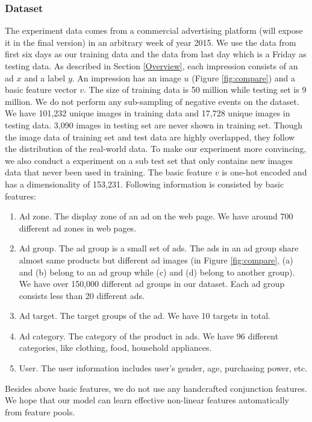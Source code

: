 \documentclass{sig-alternate}
\begin{document}
\subsubsection{Dataset}
The experiment data comes from a commercial advertising platform (will expose it in the final version) in an  arbitrary  week of year 2015. We use the data from first six days as our training data and the data from last day which is a Friday as testing data.  As described in Section \ref{Overview}, each impression consists of an ad $x$ and a label $y$.  An impression has an image $u$ (Figure \ref{fig:compare}) and a basic feature vector $v$.  The size of training data is 50 million while testing set is 9 million. We do not perform any sub-sampling of negative events on the dataset. We have 101,232 unique images in training data and 17,728 unique images in testing data. 3,090 images in testing set are never shown in training set. Though the image data of training set and test data are highly overlapped, they follow the distribution of the real-world data. To make our experiment more convincing, we also conduct a experiment on a sub test set that only contains new images data that never been used in training.  The basic feature $v$ is one-hot encoded and has a dimensionality of 153,231. Following information is consisted by basic features:
\begin{enumerate}
	\item Ad zone. The display zone of an ad on the web page. We have around 700 different ad zones in web pages.
	\item Ad group. The ad group is a small set of ads. The ads in an ad group share almost same  products but different ad images (in Figure \ref{fig:compare}, (a) and (b) belong to an ad group while (c) and (d) belong to another group). We have over 150,000 different ad groups in our dataset. Each ad group consists less than 20 different   ads.
	\item Ad target. The target groups of the ad.  We have 10 targets in total.
	\item Ad category. The category of the product in ads. We have 96 different categories, like clothing, food, household appliances. 
	\item User. The user information includes user's gender, age, purchasing power, etc. 
\end{enumerate}
Besides above basic features, we do not use any handcrafted conjunction features. We hope that  our model can learn  effective non-linear features automatically from feature pools.
\end{document}
